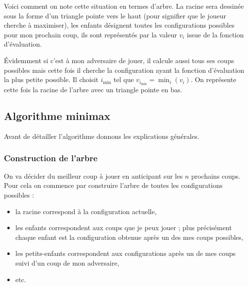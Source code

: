 \documentclass[11pt,class=report,crop=false]{standalone}
\begin{document}
Voici comment on note cette situation en termes d'arbre. La racine sera dessinée sous la forme d'un triangle pointe vers le haut (pour signifier que le joueur cherche à maximiser), les enfants désignent toutes les configurations possibles pour mon prochain coup, ils sont représentés par la valeur $v_i$ issue de la fonction d'évaluation.

\begin{center}	
\begin{minipage}{0.4\textwidth}
\end{minipage}\qquad
\begin{minipage}{0.4\textwidth}	
\end{minipage}
\end{center}

Évidemment si c'est à mon adversaire de jouer, il calcule aussi tous ses coups possibles mais cette fois il cherche la configuration ayant la fonction d'évaluation la plus petite possible. Il choisit $i_{\text{min}}$ tel que $v_{i_{\text{min}}} = \min_i (v_i)$. On représente cette fois la racine de l'arbre avec un triangle pointe en bas.

\begin{center}	
	\begin{minipage}{0.4\textwidth}
	\end{minipage}\qquad
	\begin{minipage}{0.4\textwidth}	
	\end{minipage}
\end{center}



\subsection{Algorithme minimax}

Avant de détailler l'algorithme donnons les explications générales.

\subsubsection{Construction de l'arbre}

On va décider du meilleur coup à jouer en anticipant sur les $n$ prochains coups.
Pour cela on commence par construire l'arbre de toutes les configurations possibles :
\begin{itemize}
	\item la racine correspond à la configuration actuelle,
	\item les enfants correspondent aux coups que je peux jouer ; plus précisément chaque enfant est la configuration obtenue après un des mes coups possibles,
	\item les petits-enfants correspondent aux configurations après un de mes coups suivi d'un coup de mon adversaire,
	\item etc.
\end{itemize}
\end{document}
